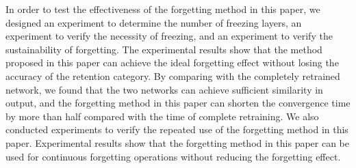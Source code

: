 \begin{abstract*}
  In order to test the effectiveness of the forgetting method in this paper, we designed an experiment to determine the number of freezing layers, 
  an experiment to verify the necessity of freezing, and an experiment to verify the sustainability of forgetting.
  The experimental results show that the method proposed in this paper can achieve the ideal forgetting effect without losing the accuracy of the retention category.
  By comparing with the completely retrained network, we found that the two networks can achieve sufficient similarity in output, 
  and the forgetting method in this paper can shorten the convergence time by more than half compared with the time of complete retraining.
  We also conducted experiments to verify the repeated use of the forgetting method in this paper. 
  Experimental results show that the forgetting method in this paper can be used for continuous forgetting operations without reducing the forgetting effect.

\end{abstract*}
